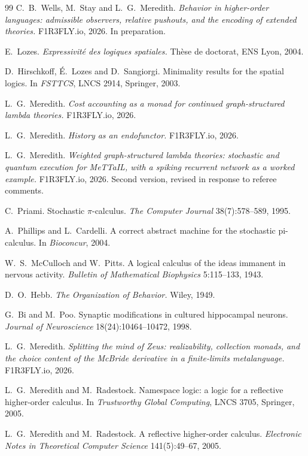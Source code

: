 \begin{thebibliography}{99}
C.\ B.\ Wells, M.\ Stay and L.\ G.\ Meredith. \emph{Behavior in higher-order languages: admissible
observers, relative pushouts, and the encoding of extended theories.} F1R3FLY.io, 2026. In preparation.

E.\ Lozes. \emph{Expressivit\'e des logiques spatiales.} Th\`ese de doctorat, ENS Lyon, 2004.

D.\ Hirschkoff, \'E.\ Lozes and D.\ Sangiorgi. Minimality results for the spatial logics. In
\emph{FSTTCS}, LNCS 2914, Springer, 2003.

L.\ G.\ Meredith. \emph{Cost accounting as a monad for continued graph-structured lambda theories.} F1R3FLY.io, 2026.

L.\ G.\ Meredith. \emph{History as an endofunctor.} F1R3FLY.io, 2026.

L.\ G.\ Meredith. \emph{Weighted graph-structured lambda theories: stochastic and quantum execution for MeTTaIL, with a spiking recurrent network as a worked example.} F1R3FLY.io, 2026. Second version, revised in response to referee comments.

C.\ Priami. Stochastic $\pi$-calculus. \emph{The Computer Journal} 38(7):578--589, 1995.

A.\ Phillips and L.\ Cardelli. A correct abstract machine for the stochastic pi-calculus. In \emph{Bioconcur}, 2004.

W.\ S.\ McCulloch and W.\ Pitts. A logical calculus of the ideas immanent in nervous activity. \emph{Bulletin of Mathematical Biophysics} 5:115--133, 1943.

D.\ O.\ Hebb. \emph{The Organization of Behavior.} Wiley, 1949.

G.\ Bi and M.\ Poo. Synaptic modifications in cultured hippocampal neurons. \emph{Journal of Neuroscience} 18(24):10464--10472, 1998.

L.\ G.\ Meredith. \emph{Splitting the mind of Zeus: realizability, collection monads, and the choice content of the McBride derivative in a finite-limits metalanguage.} F1R3FLY.io, 2026.

L.\ G.\ Meredith and M.\ Radestock. Namespace logic: a logic for a reflective higher-order calculus. In \emph{Trustworthy Global Computing}, LNCS 3705, Springer, 2005.

L.\ G.\ Meredith and M.\ Radestock. A reflective higher-order calculus. \emph{Electronic Notes in Theoretical Computer Science} 141(5):49--67, 2005.


\end{thebibliography}
